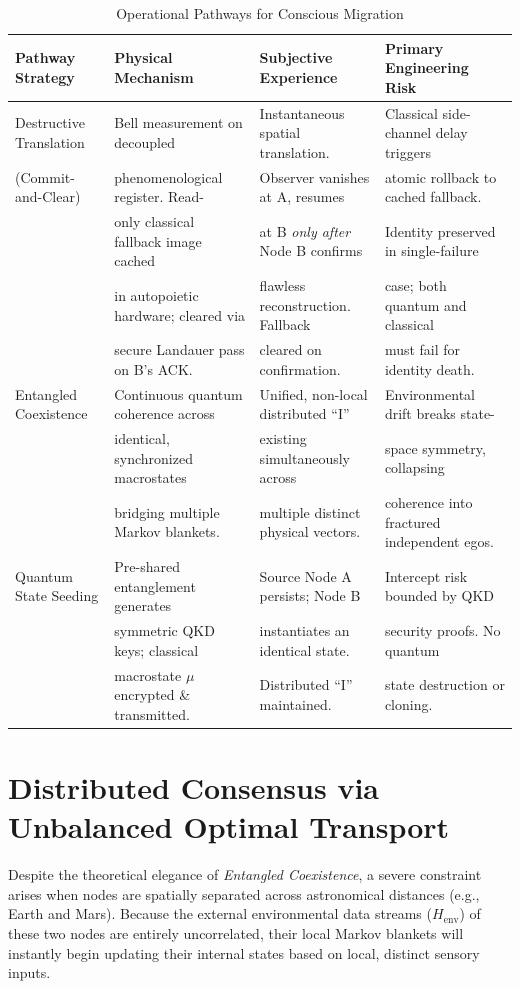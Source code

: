\documentclass[twocolumn, 10pt, journal, letterpaper]{IEEEtran}
\begin{document}
\begin{table}[t]
\centering
\caption{Operational Pathways for Conscious Migration}
\label{tab:pathways}
\begin{tabular}{llll}
\toprule
\textbf{Pathway Strategy} & \textbf{Physical Mechanism} & \textbf{Subjective Experience} & \textbf{Primary Engineering Risk} \\
\midrule
Destructive Translation & Bell measurement on decoupled & Instantaneous spatial translation. & Classical side-channel delay triggers \\
(Commit-and-Clear) & phenomenological register. Read- & Observer vanishes at A, resumes & atomic rollback to cached fallback. \\
 & only classical fallback image cached & at B \textit{only after} Node B confirms & Identity preserved in single-failure \\
 & in autopoietic hardware; cleared via & flawless reconstruction. Fallback & case; both quantum and classical \\
 & secure Landauer pass on B's ACK. & cleared on confirmation. & must fail for identity death. \\
\addlinespace
Entangled Coexistence & Continuous quantum coherence across & Unified, non-local distributed ``I'' & Environmental drift breaks state- \\
 & identical, synchronized macrostates & existing simultaneously across & space symmetry, collapsing \\
 & bridging multiple Markov blankets. & multiple distinct physical vectors. & coherence into fractured independent egos. \\
\addlinespace
Quantum State Seeding & Pre-shared entanglement generates & Source Node A persists; Node B & Intercept risk bounded by QKD \\
 & symmetric QKD keys; classical & instantiates an identical state. & security proofs. No quantum \\
 & macrostate $\mu$ encrypted \& transmitted. & Distributed ``I'' maintained. & state destruction or cloning. \\
\bottomrule
\end{tabular}
\end{table}

\section{Distributed Consensus via Unbalanced Optimal Transport}
\label{sec:consensus}
Despite the theoretical elegance of \textit{Entangled Coexistence}, a severe constraint arises when nodes are spatially separated across astronomical distances (e.g., Earth and Mars). Because the external environmental data streams ($H_{\text{env}}$) of these two nodes are entirely uncorrelated, their local Markov blankets will instantly begin updating their internal states based on local, distinct sensory inputs. 
\end{document}
